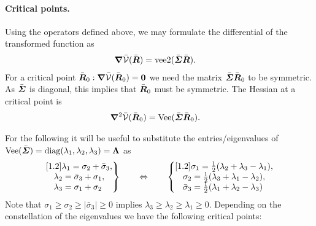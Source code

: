 \paragraph{Critical points.}
Using the operators defined above, we may formulate the differential of the transformed function as
\begin{align}
 \boldsymbol{\nabla} \bar{\mathcal{V}}(\bar{\boldsymbol{R}}) &= \operatorname{vee2}(\bar{\boldsymbol{\varSigma}} \bar{\boldsymbol{R}}).
\end{align}
For a critical point $\bar{\boldsymbol{R}}_0 : \boldsymbol{\nabla} \bar{\mathcal{V}}(\bar{\boldsymbol{R}}_0)=\boldsymbol{0}$ we need the matrix $\bar{\boldsymbol{\varSigma}} \bar{\boldsymbol{R}}_0$ to be symmetric.
As $\bar{\boldsymbol{\varSigma}}$ is diagonal, this implies that $\bar{\boldsymbol{R}}_0$ must be symmetric.
The Hessian at a critical point is
\begin{align}
 \boldsymbol{\nabla}^2 \bar{\mathcal{V}}(\bar{\boldsymbol{R}}_0) &= \operatorname{Vee}(\bar{\boldsymbol{\varSigma}} \bar{\boldsymbol{R}}_0).
\end{align}

For the following it will be useful to substitute the entries/eigenvalues of $\operatorname{Vee}(\bar{\boldsymbol{\varSigma}}) = \operatorname{diag}(\lambda_1, \lambda_2, \lambda_3) = \boldsymbol{\Lambda}$ as
\begin{align}
 \left.\begin{matrix}[1.2]
 \lambda_1 = \sigma_2 + \bar{\sigma}_3, \\
 \lambda_2 = \bar{\sigma}_3 + \sigma_1, \\
 \lambda_3 = \sigma_1 + \sigma_2\hphantom{,}  
 \end{matrix}\right\}
\qquad\Leftrightarrow \qquad
 \left\{\begin{matrix}[1.2]
 \sigma_1 = \tfrac{1}{2} (\lambda_2 + \lambda_3 - \lambda_1), \\
 \sigma_2 = \tfrac{1}{2} (\lambda_3 + \lambda_1 - \lambda_2), \\
 \bar{\sigma}_3 = \tfrac{1}{2} (\lambda_1 + \lambda_2 - \lambda_3)\hphantom{,}  
 \end{matrix}\right.
\end{align} 
Note that $\sigma_1 \geq \sigma_2 \geq |\bar{\sigma}_3| \geq 0$ implies $\lambda_3 \geq \lambda_2 \geq \lambda_1 \geq 0$.
Depending on the constellation of the eigenvalues we have the following critical points:

